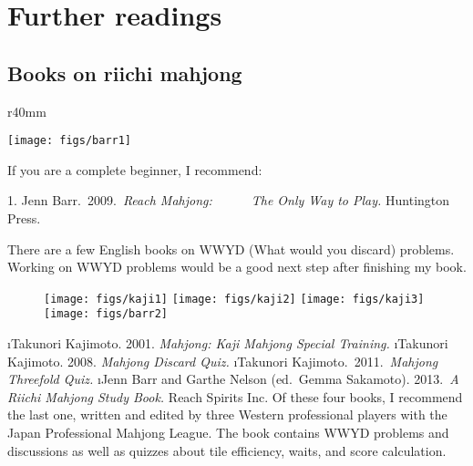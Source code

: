 \chapter{Further readings} \label{ch:read}
\thispagestyle{empty}
\section{Books on riichi mahjong}
\begin{wrapfigure}{r}{40mm}
\vspace{-35pt}
\begin{center}
\texttt{[image: figs/barr1]}
\end{center}
\vspace{-50pt}
\end{wrapfigure}

\noindent If you are a complete beginner, I recommend:

\bigskip
\noindent \hspace{10pt}1. Jenn Barr.~2009.~\textit{Reach Mahjong:}\textit{~~~~~~The Only Way to Play.} Huntington Press.

\bigskip
\noindent There are a few English books on WWYD (What would you discard) problems. Working on WWYD problems would be a good next step after finishing my book.

\begin{figure}
\begin{center}
\texttt{[image: figs/kaji1]}
\texttt{[image: figs/kaji2]}
\texttt{[image: figs/kaji3]}
\texttt{[image: figs/barr2]}
\end{center}
\end{figure}



\be \setcounter{enumi}{1}
\i Takunori Kajimoto. 2001. \textit{Mahjong: Kaji Mahjong Special Training.}
\i Takunori Kajimoto. 2008. \textit{Mahjong Discard Quiz.} 
\i Takunori Kajimoto.~2011.~\textit{Mahjong Threefold Quiz.} 
\i Jenn Barr and Garthe Nelson (ed.~Gemma Sakamoto). 2013.~\textit{A Riichi Mahjong Study Book.} Reach Spirits Inc.
\ee {}
Of these four books, I recommend the last one, written and edited by three Western professional players with the Japan Professional Mahjong League. The book contains WWYD problems and discussions as well as quizzes about tile efficiency, waits, and score calculation. 

